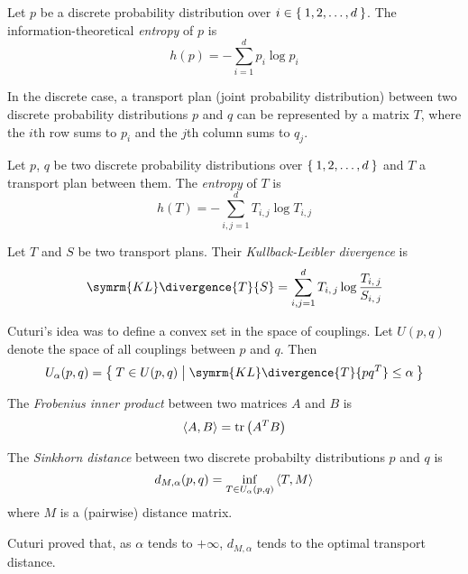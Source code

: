 \begin{definition}
Let \(p\) be a discrete probability distribution over \(i \in \Set{ 1, 2, \dots, d }\). The information-theoretical \emph{entropy} of \(p\) is
\[
    h(p) = - \sum_{i = 1}^{d} p_i \log p_i
\]
\end{definition}

\begin{remark*}
In the discrete case, a transport plan (joint probability distribution) between two discrete probability distributions \(p\) and \(q\) can be represented by a matrix \(T\), where the \(i\)th row sums to \(p_i\) and the \(j\)th column sums to \(q_j\).
\end{remark*}

\begin{definition}
Let \(p\), \(q\) be two discrete probability distributions over \(\Set{ 1, 2, \dots, d }\) and \(T\) a transport plan between them. The \emph{entropy} of \(T\) is
\[
    h(T) = - \sum_{i, j = 1}^{d} T_{i, j} \log T_{i, j}
\]
\end{definition}

\begin{definition}
Let \(T\) and \(S\) be two transport plans. Their \emph{Kullback-Leibler divergence} is
\[
    \symrm{KL} \divergence{T}{S} = \sum_{i, j = 1}^{d} T_{i, \, j} \log \frac{T_{i, \, j}}{S_{i, \, j}}
\]
\end{definition}

Cuturi's idea was to define a convex set in the space of couplings. Let \(U(p, q)\) denote the space of all couplings between \(p\) and \(q\). Then
\[
    U_{\alpha} (p, q) = \Set{ T \in U(p, q) | \symrm{KL} \divergence{T}{p q^{T}} \leq \alpha}
\]

\begin{definition}
The \emph{Frobenius inner product} between two matrices \(A\) and \(B\) is
\[
    \left\langle A, B \right\rangle = \operatorname{tr}\left(A^{T} B\right)
\]
\end{definition}

\begin{definition}
The \emph{Sinkhorn distance} between two discrete probabilty distributions \(p\) and \(q\) is
\[
    d_{M, \alpha} (p, q) = \inf_{T \in U_{\alpha} (p, q)} \left\langle T, M \right\rangle
\]
where \(M\) is a (pairwise) distance matrix.
\end{definition}

Cuturi proved that, as \(\alpha\) tends to \(+\infty\), \(d_{M, \alpha}\) tends to the optimal transport distance.

